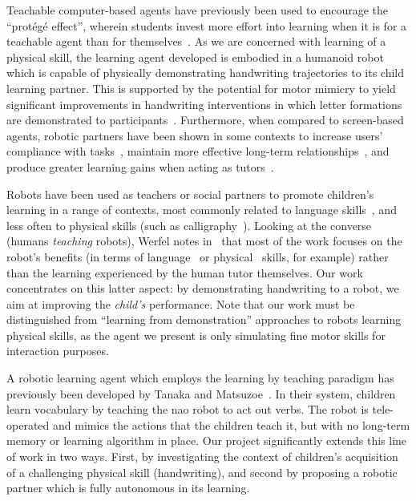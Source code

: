 \documentclass{sig-alternate}
\begin{document}
Teachable computer-based agents have previously been used to encourage the
``protégé effect'', wherein students invest more effort into learning when it is
for a teachable agent than for themselves~\cite{Chase2009}.  As we are concerned
with learning of a physical skill, the learning agent developed is embodied in a
humanoid robot which is capable of physically demonstrating handwriting
trajectories to its child learning partner.  This is supported by the potential
for motor mimicry to yield significant improvements in handwriting interventions
in which letter formations are demonstrated to
participants~\cite{Berninger1997}. Furthermore, when compared to screen-based
agents, robotic partners have been shown in some contexts to increase users'
compliance with tasks~\cite{Bainbridge2011}, maintain more effective long-term
relationships~\cite{Kidd2008}, and produce greater learning gains when acting as
tutors~\cite{Leyzberg2012}.

Robots have been used as teachers or social partners to promote children's
learning in a range of contexts, most commonly related to language
skills~\cite{han2010robot}, and less often to physical skills (such as
calligraphy~\cite{Matsui2013}).  Looking at the converse (humans \emph{teaching}
robots), Werfel notes in~\cite{Werfel2014} that most of the work focuses on the
robot's benefits (in terms of language~\cite{Saunders2010} or
physical~\cite{Mulling2013} skills, for example) rather than the learning
experienced by the human tutor themselves.  Our work concentrates on this latter
aspect: by demonstrating handwriting to a robot, we aim at improving the
\emph{child's} performance. Note that our work must be distinguished from
``learning from demonstration'' approaches to robots learning physical skills,
as the agent we present is only simulating fine motor skills for interaction
purposes.

A robotic learning agent which employs the learning by teaching paradigm has
previously been developed by Tanaka and Matsuzoe~\cite{Tanaka2012}. In their
system, children learn vocabulary by teaching the {\sc nao} robot to act out
verbs. The robot is tele-operated and mimics the actions that the children teach
it, but with no long-term memory or learning algorithm in place.  Our project
significantly extends this line of work in two ways. First, by investigating the
context of children's acquisition of a challenging physical skill (handwriting),
and second by proposing a robotic partner which is fully autonomous in its
learning.
\end{document}
